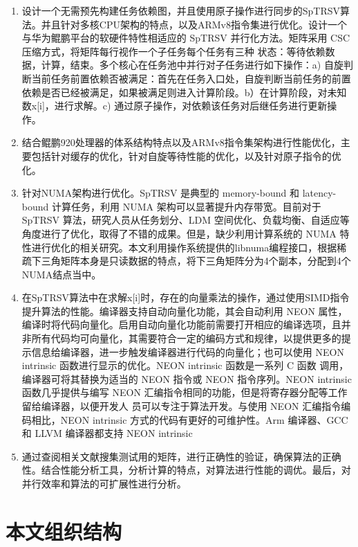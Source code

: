 \begin{enumerate} \setlength{\itemsep}{0pt}
    \item 设计一个无需预先构建任务依赖图，并且使用原子操作进行同步的SpTRSV算法。并且针对多核CPU架构的特点，以及ARMv8指令集进行优化。设计一个与华为鲲鹏平台的软硬件特性相适应的 SpTRSV 并行化方法。矩阵采用 CSC 压缩方式，将矩阵每行视作一个子任务每个任务有三种 状态：等待依赖数据，计算，结束。多个核心在任务池中并行对子任务进行如下操作：a) 自旋判断当前任务前置依赖否被满足：首先在任务入口处，自旋判断当前任务的前置依赖是否已经被满足，如果被满足则进入计算阶段。b）在计算阶段，对未知数x[i]，进行求解。c) 通过原子操作，对依赖该任务对后继任务进行更新操作。
    \item 结合鲲鹏920处理器的体系结构特点以及ARMv8指令集架构进行性能优化，主要包括针对缓存的优化，针对自旋等待性能的优化，以及针对原子指令的优化。
    \item 针对NUMA架构进行优化。SpTRSV 是典型的 memory-bound 和 latency-bound 计算任务，利用 NUMA 架构可以显著提升内存带宽。目前对于 SpTRSV 算法，研究人员从任务划分、LDM 空间优化、负载均衡、自适应等角度进行了优化，取得了不错的成果。但是，缺少利用计算系统的 NUMA 特性进行优化的相关研究。本文利用操作系统提供的libnuma编程接口，根据稀疏下三角矩阵本身是只读数据的特点，将下三角矩阵分为4个副本，分配到4个NUMA结点当中。
    \item 在SpTRSV算法中在求解x[i]时，存在的向量乘法的操作，通过使用SIMD指令提升算法的性能。编译器支持自动向量化功能，其会自动利用 NEON 属性，编译时将代码向量化。启用自动向量化功能前需要打开相应的编译选项，且并非所有代码均可向量化，其需要符合一定的编码方式和规律，以提供更多的提示信息给编译器，进一步触发编译器进行代码的向量化；也可以使用 NEON intrinsic 函数进行显示的优化。NEON intrinsic 函数是一系列 C 函数 调用，编译器可将其替换为适当的 NEON 指令或 NEON 指令序列。NEON intrinsic 函数几乎提供与编写 NEON 汇编指令相同的功能，但是将寄存器分配等工作留给编译器，以便开发人 员可以专注于算法开发。与使用 NEON 汇编指令编码相比，NEON intrinsic 方式的代码有更好的可维护性。Arm 编译器、GCC 和 LLVM 编译器都支持 NEON intrinsic
    \item 通过查阅相关文献搜集测试用的矩阵，进行正确性的验证，确保算法的正确性。结合性能分析工具，分析计算的特点，对算法进行性能的调优。最后，对并行效率和算法的可扩展性进行分析。
\end{enumerate}

\section{本文组织结构}

